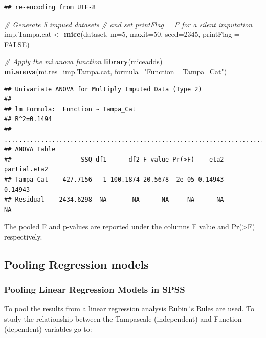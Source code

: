 \documentclass[]{book}
\newenvironment{Shaded}{\begin{snugshade}}{\end{snugshade}}
\newcommand{\KeywordTok}[1]{\textcolor[rgb]{0.13,0.29,0.53}{\textbf{#1}}}
\newcommand{\DataTypeTok}[1]{\textcolor[rgb]{0.13,0.29,0.53}{#1}}
\newcommand{\DecValTok}[1]{\textcolor[rgb]{0.00,0.00,0.81}{#1}}
\newcommand{\StringTok}[1]{\textcolor[rgb]{0.31,0.60,0.02}{#1}}
\newcommand{\CommentTok}[1]{\textcolor[rgb]{0.56,0.35,0.01}{\textit{#1}}}
\newcommand{\OtherTok}[1]{\textcolor[rgb]{0.56,0.35,0.01}{#1}}
\newcommand{\NormalTok}[1]{#1}
\begin{document}
\begin{verbatim}
## re-encoding from UTF-8
\end{verbatim}

\begin{Shaded}
\begin{Highlighting}[]
\CommentTok{# Generate 5 impued datasets }
\CommentTok{# and set printFlag = F for a silent imputation}
\NormalTok{imp.Tampa.cat <-}\StringTok{ }\KeywordTok{mice}\NormalTok{(dataset, }\DataTypeTok{m=}\DecValTok{5}\NormalTok{, }\DataTypeTok{maxit=}\DecValTok{50}\NormalTok{, }\DataTypeTok{seed=}\DecValTok{2345}\NormalTok{, }\DataTypeTok{printFlag =} \OtherTok{FALSE}\NormalTok{)}

\CommentTok{# Apply the mi.anova function}
\KeywordTok{library}\NormalTok{(miceadds)}
\KeywordTok{mi.anova}\NormalTok{(}\DataTypeTok{mi.res=}\NormalTok{imp.Tampa.cat, }\DataTypeTok{formula=}\StringTok{"Function ~ Tampa_Cat"}\NormalTok{)}
\end{Highlighting}
\end{Shaded}

\begin{verbatim}
## Univariate ANOVA for Multiply Imputed Data (Type 2)  
## 
## lm Formula:  Function ~ Tampa_Cat
## R^2=0.1494 
## ..........................................................................
## ANOVA Table 
##                   SSQ df1      df2 F value Pr(>F)    eta2 partial.eta2
## Tampa_Cat    427.7156   1 100.1874 20.5678  2e-05 0.14943      0.14943
## Residual    2434.6298  NA       NA      NA     NA      NA           NA
\end{verbatim}

The pooled F and p-values are reported under the columns F value and
Pr(\textgreater{}F) respectively.

\subsection{Pooling Regression models}\label{pooling-regression-models}

\subsubsection{Pooling Linear Regression Models in
SPSS}\label{pooling-linear-regression-models-in-spss}

To pool the results from a linear regression analysis Rubin´s Rules are
used. To study the relationship between the Tampascale (independent) and
Function (dependent) variables go to:
\end{document}
